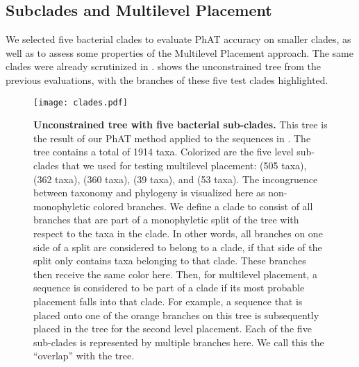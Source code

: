 \subsection{Subclades and Multilevel Placement}
\label{ch:AutomaticTrees:sec:Evaluation:sub:MultilevelPlacement}

We selected five bacterial clades to evaluate \ac{PhAT} accuracy on smaller clades,
as well as to assess some properties of the Multilevel Placement approach.
The same clades were already scrutinized in  \cite{Kozlov2016}.
 shows the unconstrained  tree from the previous evaluations,
with the branches of these five test clades highlighted.

\begin{figure}[hpbt]
    \centering
    \texttt{[image: clades.pdf]}
    \vspace*{0.5em}
    \caption[Unconstrained  tree with five bacterial sub-clades]{
        \textbf{Unconstrained  tree with five bacterial sub-clades.}
        This tree is the result of our \ac{PhAT} method
        applied to the  sequences in .
        The tree contains a total of 1914 taxa.
        Colorized are the five  level sub-clades that we used for testing multilevel placement:
         (505 taxa),  (362 taxa),  (360 taxa),
         (39 taxa), and  (53 taxa).
        The incongruence between taxonomy and phylogeny is visualized here as non-monophyletic colored branches.
        We define a clade to consist of all branches
        that are part of a monophyletic split of the tree with respect to the taxa in the clade.
        In other words, all branches on one side of a split are considered to belong to a clade,
        if that side of the split only contains taxa belonging to that clade.
        These branches then receive the same color here.
        Then, for multilevel placement, a sequence is considered to be part of a clade
        if its most probable placement falls into that clade.
        For example, a sequence that is placed onto one of the orange branches on this tree
        is subsequently placed in the  tree for the second level placement.
        Each of the five sub-clades is represented by multiple branches here.
        We call this the ``overlap'' with the  tree.
    }
    \label{fig:clades}
\end{figure}

